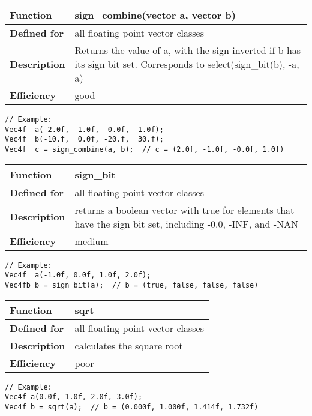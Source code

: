 \documentclass[vcl_manual.tex]{subfiles}
\begin{document}
\begin{tabular}{|p{25mm}|p{100mm}|}
\hline
\bfseries Function & sign\_combine(vector a, vector b) \\ \hline
\bfseries Defined for & all floating point vector classes \\ \hline
\bfseries Description & Returns the value of a, with the sign inverted if b has its sign bit set.\newline
Corresponds to select(sign\_bit(b), -a, a) \\ \hline
\bfseries Efficiency & good \\ \hline
\end{tabular}
\begin{lstlisting}[frame=none]
// Example:
Vec4f  a(-2.0f, -1.0f,  0.0f,  1.0f);
Vec4f  b(-10.f,  0.0f, -20.f,  30.f);
Vec4f  c = sign_combine(a, b);  // c = (2.0f, -1.0f, -0.0f, 1.0f)
\end{lstlisting}


\begin{tabular}{|p{25mm}|p{100mm}|}
\hline
\bfseries Function & sign\_bit \\ \hline
\bfseries Defined for & all floating point vector classes \\ \hline
\bfseries Description & returns a boolean vector with true for elements that have the sign bit set, including -0.0, -INF, and -NAN \\ \hline
\bfseries Efficiency & medium \\ \hline
\end{tabular}
\begin{lstlisting}[frame=none]
// Example:
Vec4f  a(-1.0f, 0.0f, 1.0f, 2.0f);
Vec4fb b = sign_bit(a);  // b = (true, false, false, false)
\end{lstlisting}


\begin{tabular}{|p{25mm}|p{100mm}|}
\hline
\bfseries Function & sqrt \\ \hline
\bfseries Defined for & all floating point vector classes \\ \hline
\bfseries Description & calculates the square root \\ \hline
\bfseries Efficiency & poor \\ \hline
\end{tabular}
\begin{lstlisting}[frame=none]
// Example:
Vec4f a(0.0f, 1.0f, 2.0f, 3.0f);
Vec4f b = sqrt(a);  // b = (0.000f, 1.000f, 1.414f, 1.732f)
\end{lstlisting}
\end{document}
